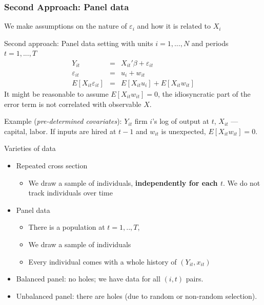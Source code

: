\documentclass[notes=show,beamer,compress]{beamer}
\begin{document}
\begin{frame}
\frametitle{Second Approach: Panel data}

We make assumptions on the nature of $\varepsilon_i$ and how it is related to $X_i$
\bigskip

Second approach: Panel data setting with units $i=1, ..., N$ and periods  $t=1, ..., T$
\begin{eqnarray*}
 Y_{it} &=& X_{it}'\beta + \varepsilon_{it}\\
         \varepsilon_{it} &=& u_i + w_{it} \\
         E\left[X_{it} \varepsilon_{it}\right] &=& E\left[X_{it} u_{i}\right]+ E\left[X_{it} w_{it}\right]
\end{eqnarray*}
It might be reasonable to assume $ E\left[X_{it} w_{it}\right]=0$, the idiosyncratic part of the error term is not correlated with observable $X$.\\\bigskip

Example (\emph{pre-determined covariates}): $Y_{it}$ firm $i$'s log of output at $t$, $X_{it}$ --- capital, labor. If inputs are hired at $t-1$ and $w_{it}$ is unexpected, $E[X_{it}w_{it}]=0$.

\end{frame}


\begin{frame}{Varieties of data}
	\begin{itemize}
				\item{Repeated cross section
			\begin{itemize}
				\item{We draw a sample of individuals, \textbf{independently for each $t$}. We do not track individuals over time}
		\end{itemize}}
		\item{Panel data
			\begin{itemize}
				\item{There is a population at $t=1,..,T$,}
				\item{We draw a sample of individuals}
				\item{Every individual comes with a whole history of $(Y_{it}, x_{it})$}
			\end{itemize}}

		\item{Balanced panel: no holes; we have data for all $(i, t)$ pairs.}
		\item{Unbalanced panel: there are holes (due to random or non-random selection).}
	\end{itemize}
\end{frame}
\end{document}
